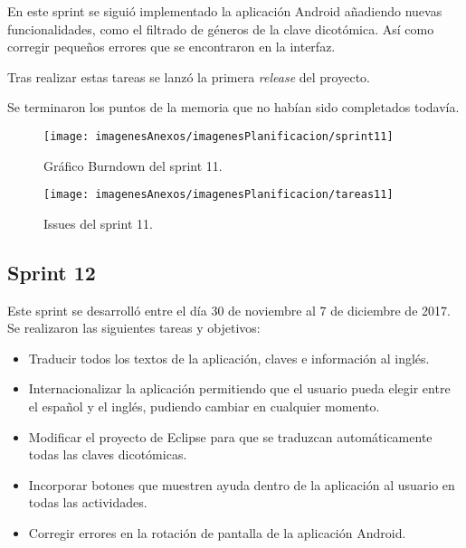 En este sprint se siguió implementado la aplicación Android añadiendo nuevas funcionalidades, como el filtrado de géneros de la clave dicotómica. Así como corregir pequeños errores que se encontraron en la interfaz.

Tras realizar estas tareas se lanzó la primera \textit{release} del proyecto.

Se terminaron los puntos de la memoria que no habían sido completados todavía.

\begin{figure}[h]
    \begin{center}%
        \begin{center}%
          \texttt{[image: imagenesAnexos/imagenesPlanificacion/sprint11]}%
          \caption{Gráfico Burndown del sprint 11.}%
          \label{figSprint11}%
        \end{center}%
  	\end{center}%
\end{figure}%

\begin{figure}[h]
    \begin{center}%
        \begin{center}%
          \texttt{[image: imagenesAnexos/imagenesPlanificacion/tareas11]}%
          \caption{Issues del sprint 11.}%
          \label{figTareas11}%
        \end{center}%
  	\end{center}%
\end{figure}%

\newpage

\subsection{Sprint 12}

Este sprint se desarrolló entre el día 30 de noviembre al 7 de diciembre de 2017. Se realizaron las siguientes tareas y objetivos:

\begin{itemize}
	\item Traducir todos los textos de la aplicación, claves e información al inglés.
	\item Internacionalizar la aplicación permitiendo que el usuario pueda elegir entre el español y el inglés, pudiendo cambiar en cualquier momento.
	\item Modificar el proyecto de Eclipse para que se traduzcan automáticamente todas las claves dicotómicas.
	\item Incorporar botones que muestren ayuda dentro de la aplicación al usuario en todas las actividades.
	\item Corregir errores en la rotación de pantalla de la aplicación Android.
\end{itemize}

